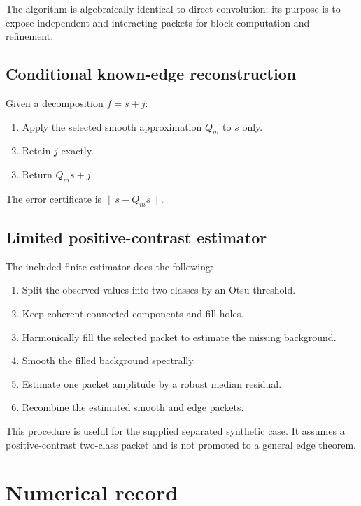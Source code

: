 \documentclass[11pt,a4paper]{article}
\theoremstyle{definition}
\theoremstyle{remark}
\begin{document}
The algorithm is algebraically identical to direct convolution; its purpose is to expose independent and interacting packets for block computation and refinement.

\subsection{Conditional known-edge reconstruction}

Given a decomposition $f=s+j$:

\begin{enumerate}
\item Apply the selected smooth approximation $Q_m$ to $s$ only.
\item Retain $j$ exactly.
\item Return $Q_ms+j$.
\end{enumerate}

The error certificate is $\|s-Q_ms\|$.

\subsection{Limited positive-contrast estimator}

The included finite estimator does the following:

\begin{enumerate}
\item Split the observed values into two classes by an Otsu threshold.
\item Keep coherent connected components and fill holes.
\item Harmonically fill the selected packet to estimate the missing background.
\item Smooth the filled background spectrally.
\item Estimate one packet amplitude by a robust median residual.
\item Recombine the estimated smooth and edge packets.
\end{enumerate}

This procedure is useful for the supplied separated synthetic case. It assumes a positive-contrast two-class packet and is not promoted to a general edge theorem.

\section{Numerical record}\label{core:section:19}
\end{document}
